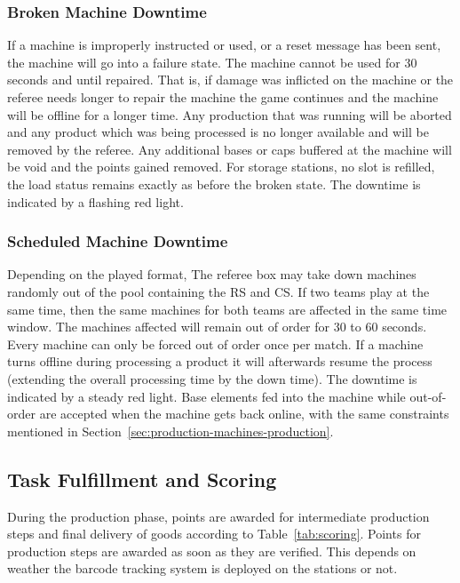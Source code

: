 \documentclass[12pt,twoside]{article}
\newcommand{\refsec}[1]{Section~\ref{#1}}
\newcommand{\reftab}[1]{Table~\ref{#1}}
\begin{document}
\subsubsection{Broken Machine Downtime}
\label{sec:broken-machine}
If a machine is improperly instructed or used, or a reset message has
been sent, the machine will go into a failure state. The machine cannot be
used for 30 seconds and until repaired.
That is, if damage was
inflicted on the machine or the referee needs longer to repair the
machine the game continues and the machine will be offline for a
longer time. Any production that was running will be aborted and any
product which was being processed is no longer available and will be
removed by the referee. Any additional bases or caps buffered at the machine
will be void and the points gained removed. For storage stations, no
slot is refilled, the load status remains exactly as before the broken
state. The downtime is indicated by a flashing red light.


\subsubsection{Scheduled Machine Downtime}
\label{sec:out-of-order}
Depending on the played format, The referee box may take down machines
randomly out of the pool containing the RS and CS\@.
If two teams play at the same time, then the same machines for
both teams are affected in the same time window.
The machines affected will remain out of order for 30 to 60
seconds. Every machine can only be forced out of order once per
match. If a machine turns offline during processing a product it will
afterwards resume the process (extending the overall processing time
by the down time). The downtime is indicated by a steady red
light. Base elements fed into the machine while out-of-order are
accepted when the machine gets back online, with the same constraints
mentioned in \refsec{sec:production-machines-production}.



\subsection{Task Fulfillment and Scoring}
\label{sec:production-scoring}
During the production phase, points are awarded for intermediate
production steps and final delivery of goods according to
\reftab{tab:scoring}.
Points for production steps are awarded as soon as they are verified.
This depends on weather the barcode tracking system is deployed on the
stations or not.
\end{document}
